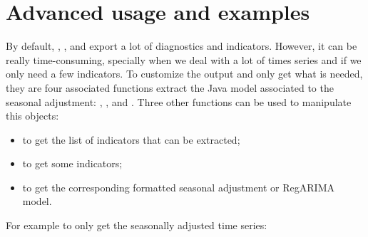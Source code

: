 \documentclass[article]{jss}
\providecommand{\tightlist}{%
  \setlength{\itemsep}{0pt}\setlength{\parskip}{0pt}}
\begin{document}
\hypertarget{advanced-usage-and-examples}{%
\section{Advanced usage and
examples}\label{advanced-usage-and-examples}}

By default, , ,  and
 export a lot of diagnostics and indicators.
However, it can be really time-consuming, specially when we deal with a
lot of times series and if we only need a few indicators. To customize
the output and only get what is needed, they are four associated
functions extract the Java model associated to the seasonal adjustment:
, ,  and
. Three other functions can be used to
manipulate this objects:

\begin{itemize}
\tightlist
\item
   to get the list of indicators that can be
  extracted;\\
\item
   to get some indicators;\\
\item
   to get the corresponding formatted seasonal adjustment
  or RegARIMA model.
\end{itemize}

For example to only get the seasonally adjusted time series:
\end{document}
